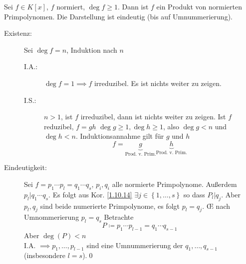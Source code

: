 \begin{subtheorem}
	Sei $ f \in K[x] $, $ f $ normiert, $ \deg f \geq 1 $. Dann ist $ f $ ein Produkt von normierten Primpolynomen.
	Die  Darstellung ist eindeutig (bis auf Umnummerierung).
\end{subtheorem}
\begin{subproof*}
	\begin{description}
		\item[Existenz:] Sei $ \deg f = n $, Induktion nach $ n $ 
			\begin{description}
				\item[I.A.:] $ \deg f = 1 \implies f $ irreduzibel.
					Es ist nichts weiter zu zeigen.
				\item[I.S.:] $ n > 1 $, ist $ f $ irreduzibel, dann ist nichts weiter zu zeigen.
					Ist $ f $ reduzibel, $ f = gh $ $ \deg g \geq 1, \deg h \geq 1 $, also $ \deg g < n $ und $ \deg h < n $.
					Induktionsannahme gilt für $ g $ und $ h $ 
					\[
						f = \underbrace{g}_{\text{Prod. v. Prim.} } \underbrace{h}_{\text{Prod. v. Prim.} }
					\]
			\end{description}
		\item[Eindeutigkeit:] Sei $ f = p_1 \dotsb p_l = q_1 \dotsb q_s $, $ p_i, q_i $ alle normierte Primpolynome.
			Außerdem $ p_l | q_1 \dotsb q_s $.
			Es folgt aus Kor. \ref{1.10.14} $ \exists j \in \left\{ 1, \dotsc, s \right\}  $ so dass $ P_l | q_j $.
			Aber $ p_l, q_j $ sind beide numerierte Primpolynome, es folgt $ p_l = q_j $.
			\OE{} nach Umnommerierung $ p_l = q_s $ 
			Betrachte
			\[
				P \coloneqq p_1 \dotsb p_{l - 1}  = q_1 \dotsb q_{s - 1} 
			\]
			Aber $ \deg(P) < n $\\
			I.A. $ \implies p_1, \dotsc, p_{l - 1}  $ sind eine Umnummerierung der $ q_1, \dotsc, q_{s - 1}  $ (insbesondere $  l = s $).\qed
	\end{description}
	
\end{subproof*}




